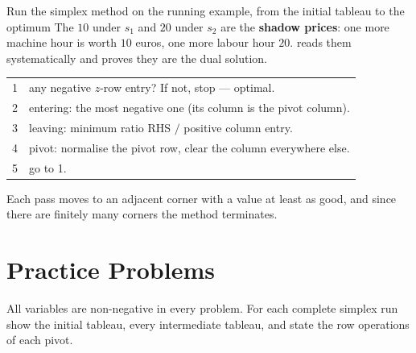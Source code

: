 \begin{worked}{Run the simplex method on the running example, from the initial tableau to the optimum}
The $10$ under $s_{1}$ and $20$ under $s_{2}$ are the \textbf{shadow
prices}: one more machine hour is worth $10$ euros, one more labour hour
$20$.  reads them systematically and  proves they are the
dual solution.

\begin{center}\footnotesize
\begin{tabular}{ll}
  \hline
  1 & any negative $z$-row entry? If not, stop --- optimal.\\
  2 & entering: the most negative one (its column is the pivot column).\\
  3 & leaving: minimum ratio RHS $/$ positive column entry.\\
  4 & pivot: normalise the pivot row, clear the column everywhere else.\\
  5 & go to 1.\\
  \hline
\end{tabular}
\end{center}
Each pass moves to an adjacent corner with a value at least as good, and
since there are finitely many corners the method terminates.
\end{worked}

\section{Practice Problems}

All variables are non-negative in every problem. For each complete simplex
run show the initial tableau, every intermediate tableau, and state the row
operations of each pivot.

